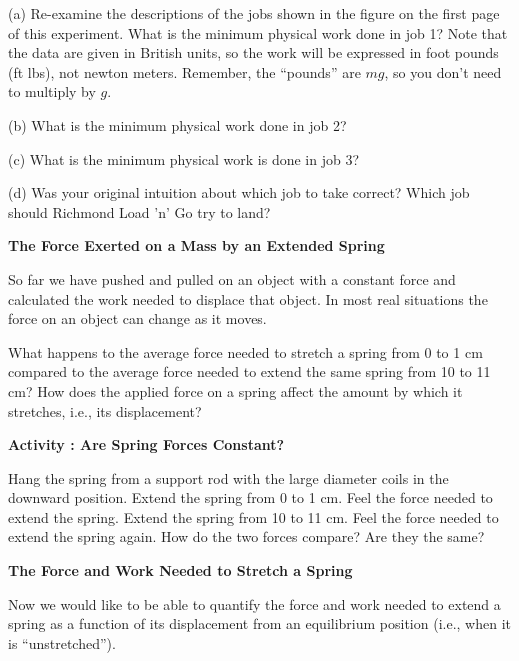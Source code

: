 (a) Re-examine the descriptions of the jobs shown in the figure on the first
page of this experiment. What is the minimum physical work done in job 1? Note that the
 data are given in British units, so the work will be expressed in foot pounds (ft lbs), 
not newton meters. 
Remember, the ``pounds'' are $mg$, so you don't need to multiply by $g$.
\vspace{12mm}

(b) What is the minimum physical work done in job 2?
\vspace{12mm}

(c) What is the minimum physical work is done in job 3?
\vspace{12mm}

(d) Was your original intuition about which job to take correct? Which job should
Richmond Load 'n' Go try to land?
\vspace{12mm}


\newpage

\textbf{The Force Exerted on a Mass by an Extended Spring} 

So far we have pushed and pulled on an object with a constant force and calculated
the work needed to displace that object. In most real situations the force on
an object can change as it moves. 

What happens to the average force needed to stretch a spring from 0 to 1 cm
compared to the average force needed to extend the same spring from 10 to 11
cm? How does the applied force on a spring affect the amount by which it stretches,
i.e., its displacement?

\textbf{Activity  : Are Spring Forces Constant?} 

Hang the spring from a support rod with the large diameter coils in the downward
position. Extend the spring from 0 to 1 cm. Feel the force needed to extend
the spring. Extend the spring from 10 to 11 cm. Feel the force needed to extend
the spring again. How do the two forces compare? Are they the same? 
\vspace{10mm}

\textbf{The Force and Work Needed to Stretch a Spring} 

Now we would like to be able to quantify the force and work needed to extend
a spring as a function of its displacement from an equilibrium position (i.e.,
when it is ``unstretched'').

